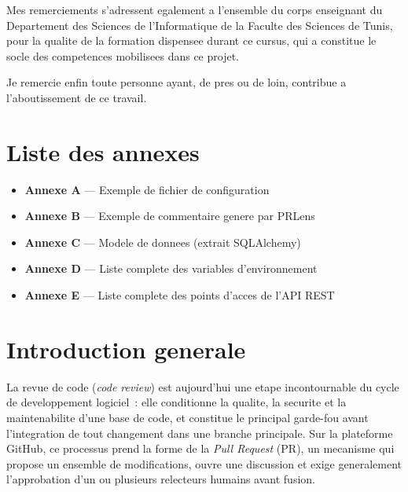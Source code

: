 \documentclass[a4paper,12pt,oneside]{report}
\begin{document}
Mes remerciements s'adressent egalement a l'ensemble du corps enseignant du Departement des Sciences de l'Informatique de la Faculte des Sciences de Tunis, pour la qualite de la formation dispensee durant ce cursus, qui a constitue le socle des competences mobilisees dans ce projet.

Je remercie enfin toute personne ayant, de pres ou de loin, contribue a l'aboutissement de ce travail.

\tableofcontents
\clearpage
\listoffigures
{}
\clearpage
\listoftables
{}
\clearpage

\chapter*{Liste des annexes}
\begin{itemize}[leftmargin=1.2cm]
  \item \textbf{Annexe A} --- Exemple de fichier de configuration 
  \item \textbf{Annexe B} --- Exemple de commentaire genere par PRLens
  \item \textbf{Annexe C} --- Modele de donnees (extrait SQLAlchemy)
  \item \textbf{Annexe D} --- Liste complete des variables d'environnement
  \item \textbf{Annexe E} --- Liste complete des points d'acces de l'API REST
\end{itemize}

\clearpage
{}

\chapter*{Introduction generale}

La revue de code (\emph{code review}) est aujourd'hui une etape incontournable du cycle de developpement logiciel~: elle conditionne la qualite, la securite et la maintenabilite d'une base de code, et constitue le principal garde-fou avant l'integration de tout changement dans une branche principale. Sur la plateforme GitHub, ce processus prend la forme de la \emph{Pull Request} (PR), un mecanisme qui propose un ensemble de modifications, ouvre une discussion et exige generalement l'approbation d'un ou plusieurs relecteurs humains avant fusion.
\end{document}
